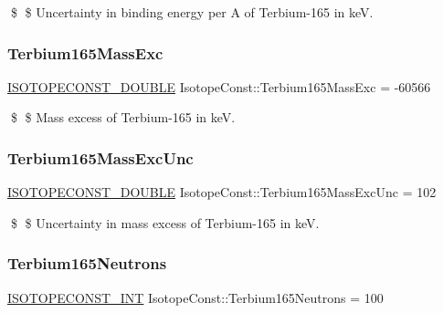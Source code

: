 \$ \$ Uncertainty in binding energy per A of Terbium-\/165 in keV. \mbox{\label{group___isotope_const-_terbium-_tb165_ga90e199f889f633f483003c903ec9c0f2}} 
\subsubsection{\texorpdfstring{Terbium165\+Mass\+Exc}{Terbium165MassExc}}
{\footnotesize\ttfamily \mbox{\hyperlink{group___isotope_const-_macros_ga8f45a7272ce02c0b4c65c44636ed719a}{I\+S\+O\+T\+O\+P\+E\+C\+O\+N\+S\+T\+\_\+\+D\+O\+U\+B\+LE}} Isotope\+Const\+::\+Terbium165\+Mass\+Exc = -\/60566}

\$ \$ Mass excess of Terbium-\/165 in keV. \mbox{\label{group___isotope_const-_terbium-_tb165_ga2165df688919a359ef7158e37dd0161b}} 
\subsubsection{\texorpdfstring{Terbium165\+Mass\+Exc\+Unc}{Terbium165MassExcUnc}}
{\footnotesize\ttfamily \mbox{\hyperlink{group___isotope_const-_macros_ga8f45a7272ce02c0b4c65c44636ed719a}{I\+S\+O\+T\+O\+P\+E\+C\+O\+N\+S\+T\+\_\+\+D\+O\+U\+B\+LE}} Isotope\+Const\+::\+Terbium165\+Mass\+Exc\+Unc = 102}

\$ \$ Uncertainty in mass excess of Terbium-\/165 in keV. \mbox{\label{group___isotope_const-_terbium-_tb165_ga332ccf1f9dfd3dc833abade481da94e7}} 
\subsubsection{\texorpdfstring{Terbium165\+Neutrons}{Terbium165Neutrons}}
{\footnotesize\ttfamily \mbox{\hyperlink{group___isotope_const-_macros_ga5f18360b3e99483a35c32d789e62621c}{I\+S\+O\+T\+O\+P\+E\+C\+O\+N\+S\+T\+\_\+\+I\+NT}} Isotope\+Const\+::\+Terbium165\+Neutrons = 100}


